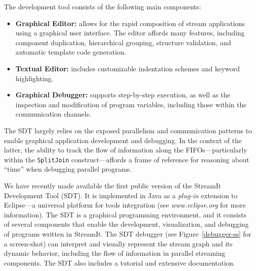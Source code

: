 \documentclass{csailabstractbook}
\begin{document}
The  development  tool consists  of the following main components:
\begin{itemize}
\item {\bf Graphical Editor:} allows for the rapid composition of
stream applications using a graphical user interface. The editor
affords many features, including  component duplication, hierarchical
grouping, structure validation, and automatic template code generation.
\item {\bf Textual Editor:} includes customizable indentation
schemes and keyword highlighting.
\item {\bf Graphical Debugger:} supports step-by-step execution, as well as
the inspection and modification  of program variables, including those
within the communication channels.
\end{itemize}

The  SDT largely relies  on the  exposed parallelism  and communication
patterns to enable graphical application development and debugging. In
the  context  of  the  latter,  the  ability  to  track  the  flow  of
information along the  FIFOs---particularly within the {\tt SplitJoin}
construct---affords a frame of  reference for reasoning about ``time''
when debugging parallel programs.





We  have recently  made  available  the first  public  version of  the
StreamIt Development Tool (SDT).  It  is implemented in Java as a {\it
plug-in}  extension  to   Eclipse---a  universal  platform  for  tools
integration  (see {\it www.eclipse.org}  for more  information).
The SDT  is a  graphical programming environment,  and it  consists of
several  components that  enable the  development,  visualization, and
debugging  of programs  written in  StreamIt.  The  SDT  debugger (see
Figure~\ref{debugger-ss} for a  screen-shot) can interpret and visually
represent  the stream graph  and its  dynamic behavior,  including the
flow of  information in parallel  streaming components.  The  SDT also
includes a tutorial and extensive documentation.
\end{document}

